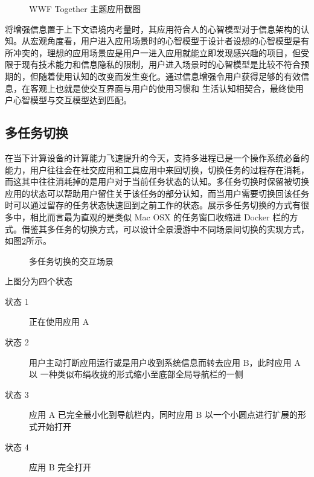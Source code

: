 \begin{figure}[htp]
\centering
{}
\caption{WWF Together 主题应用截图}
\label{fig:wwf}
\end{figure}

将增强信息置于上下文语境内考量时，其应用符合人的心智模型对于信息架构的认知。从宏观角度看，用户进入应用场景时的心智模型于设计者设想的心智模型是有所冲突的，理想的应用场景应是用户一进入应用就能立即发现感兴趣的项目，但受限于现有技术能力和信息隐私的限制，用户进入场景时的心智模型是比较不符合预期的，但随着使用认知的改变而发生变化。通过信息增强令用户获得足够的有效信息，在客观上也就是使交互界面与用户的使用习惯和 生活认知相契合，最终使用户心智模型与交互模型达到匹配。

\subsection{多任务切换}
在当下计算设备的计算能力飞速提升的今天，支持多进程已是一个操作系统必备的能力，用户往往会在社交应用和工具应用中来回切换，切换任务的过程存在消耗，而这其中往往消耗掉的是用户对于当前任务状态的认知。多任务切换时保留被切换应用的状态可以帮助用户留住关于该任务的部分认知，而当用户需要切换回该任务时可以通过留存的任务状态快速回到之前工作的状态。展示多任务切换的方式有很多中，相比而言最为直观的是类似 Mac OSX 的任务窗口收缩进 Docker 栏的方式。借鉴其多任务的切换方式，可以设计全景漫游中不同场景间切换的实现方式，如图\ref{fig:multitask}所示。

\begin{figure}[htp]
\centering
{}
\caption{多任务切换的交互场景}
\label{fig:multitask}
\end{figure}

上图分为四个状态
\begin{description}
	\item [状态 1] 正在使用应用 A
	\item [状态 2]用户主动打断应用运行或是用户收到系统信息而转去应用 B，此时应用 A 以 一种类似布绢收拢的形式缩小至底部全局导航栏的一侧
	\item [状态 3] 应用 A 已完全最小化到导航栏内，同时应用 B 以一个小圆点进行扩展的形式开始打开
	\item [状态 4] 应用 B 完全打开
\end{description}

